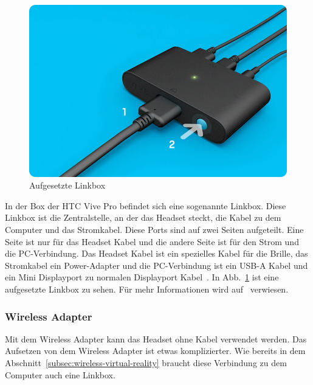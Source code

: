 \begin{figure}
    \centering
    \includegraphics[scale=0.4]{pics/link-box-setup}
    \caption{Aufgesetzte Linkbox}
    \label{fig:link-box-setup}
\end{figure}


In der Box der HTC Vive Pro befindet sich eine sogenannte Linkbox.
Diese Linkbox ist die Zentralstelle, an der das Headset steckt, die Kabel zu dem Computer und das Stromkabel.
Diese Ports sind auf zwei Seiten aufgeteilt.
Eine Seite ist nur für das Headset Kabel und die andere Seite ist für den Strom und die PC-Verbindung.
Das Headset Kabel ist ein spezielles Kabel für die Brille, das Stromkabel ein Power-Adapter und die PC-Verbindung ist ein USB-A Kabel und ein Mini Displayport zu normalen Displayport Kabel~\cite{VivePro_Setup}.
In Abb.~\ref{fig:link-box-setup} ist eine aufgesetzte Linkbox zu sehen.
Für mehr Informationen wird auf~\cite{VivePro_Setup} verwiesen.

\subsubsection{Wireless Adapter}

Mit dem Wireless Adapter kann das Headset ohne Kabel verwendet werden.
Das Aufsetzen von dem Wireless Adapter ist etwas komplizierter.
Wie bereits in dem Abschnitt~\ref{subsec:wireless-virtual-reality} braucht diese Verbindung zu dem Computer auch eine Linkbox.

